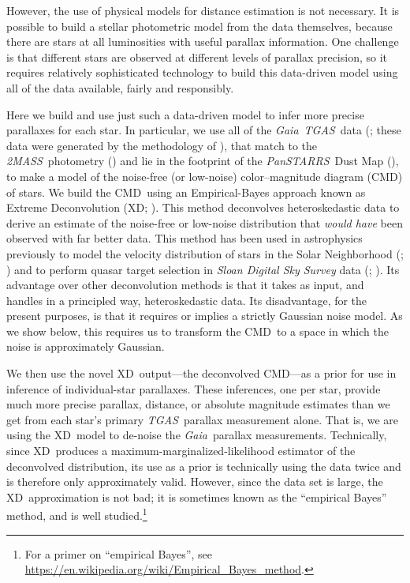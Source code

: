 \documentclass[modern]{aastex61}
\newcommand{\acronym}[1]{{\small{#1}}}
\newcommand{\project}[1]{\textsl{#1}}
\newcommand{\tgas}{\project{\acronym{TGAS}}}
\newcommand{\tmass}{\project{\acronym{2MASS}}}
\newcommand{\gaia}{\project{Gaia}}
\newcommand{\panstarrs}{\project{Pan\acronym{STARRS}}}
\newcommand{\xd}{\acronym{XD}}
\newcommand{\cmd}{\acronym{CMD}}
\begin{document}
However, the use of physical models for distance estimation is not necessary.
It is possible to build a stellar photometric model from the data themselves,
because there are stars at all luminosities with useful parallax information.
One challenge is that different stars are observed at different levels of parallax precision,
so it requires relatively sophisticated technology to build this data-driven model
using all of the data available, fairly and responsibly.

Here we build and use just such a data-driven model to infer more precise parallaxes for each star.
In particular, we use all of the \gaia\ \tgas\ data (\citealt{tgas};
these data were generated by the methodology of \citealt{michalik15}), that match to the
\tmass\ photometry (\citealt{skrutskie06}) and lie in the footprint of
the \panstarrs\ Dust Map (\citealt{green15}), to make a model of the
noise-free (or low-noise) color--magnitude diagram (\cmd) of stars.
We build the \cmd\ using an Empirical-Bayes approach known as Extreme Deconvolution (XD;
\citealt{bovy11}).
This method deconvolves heteroskedastic data to derive an
estimate of the noise-free or low-noise distribution that \emph{would
  have} been observed with far better data.
This method has been used in astrophysics
previously to model the velocity distribution of stars in the Solar
Neighborhood (\citealt{hogg05}; \citealt{bovy09}) and to
perform quasar target selection
in \project{Sloan Digital Sky Survey} data (\citealt{xdqso}; \citealt{xdqsoz}).
Its advantage over other deconvolution methods is that it takes as input,
and handles in a principled way, heteroskedastic data.
Its disadvantage, for the present purposes, is that it requires
or implies a strictly Gaussian noise model.
As we show below, this requires us to transform the \cmd\ to a space in which
the noise is approximately Gaussian.

We then use the novel \xd\ output---the deconvolved \cmd---as
a prior for use in inference of individual-star parallaxes.
These inferences, one per star, provide much more precise parallax, distance,
or absolute magnitude estimates than we get from each star's primary
\tgas\ parallax measurement alone.
That is, we are using the \xd\ model to de-noise the \gaia\ parallax
measurements.
Technically, since \xd\ produces a maximum-marginalized-likelihood estimator
of the deconvolved distribution,
its use as a prior is technically using the data twice and is therefore only approximately valid.
However, since the data set is large, the \xd\ approximation is not bad; it is
sometimes known as the ``empirical Bayes'' method, and is well studied.\footnote{For a primer on ``empirical Bayes'', see \url{https://en.wikipedia.org/wiki/Empirical_Bayes_method}.}
\end{document}

